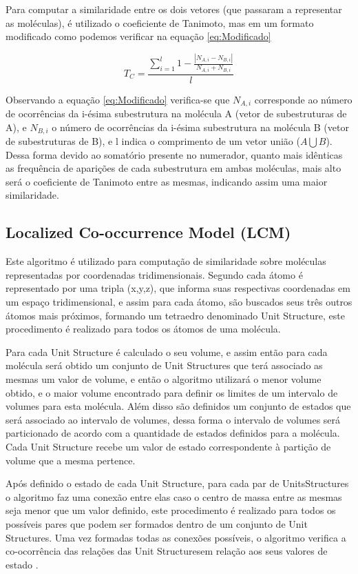 Para computar a similaridade entre os dois vetores (que passaram a representar as 
moléculas), é utilizado o coeficiente de Tanimoto, mas em um formato modificado como podemos verificar na equação \eqref{eq:Modificado}

\begin{equation}
T_{C} =\frac{\sum\limits_{i=1}^{l}1-\frac{|N_{A,i}-N_{B,i}|}{N_{A,i}+N_{B,i}}}{l}
\label{eq:Modificado}
\end{equation}

Observando a equação \eqref{eq:Modificado} verifica-se que $N_{A,i}$ corresponde ao número de ocorrências da i-ésima subestrutura na molécula A (vetor de subestruturas de A), e $N_{B,i}$ o número de 
ocorrências da i-ésima subestrutura na molécula B (vetor de subestruturas de B), e l indica o 
comprimento de um vetor união ($A\bigcup B$). Dessa forma devido ao somatório presente no 
numerador, quanto mais idênticas as frequência de aparições de cada subestrutura em ambas 
moléculas, mais alto será o coeficiente de Tanimoto entre as mesmas, indicando assim uma 
maior similaridade.

\subsection{Localized Co-occurrence Model (LCM)}
Este algoritmo é utilizado para computação de similaridade sobre moléculas
representadas por coordenadas tridimensionais. Segundo \cite{huang2008localized} cada átomo é representado por uma tripla (x,y,z), que informa suas respectivas coordenadas em um espaço tridimensional, e assim para cada átomo, são buscados seus três outros átomos mais próximos, formando um tetraedro denominado Unit Structure, este procedimento é realizado para todos os átomos de uma molécula.

Para cada Unit Structure é calculado o seu volume, e assim então para cada molécula 
será obtido um conjunto de Unit Structures que terá associado as mesmas um valor de 
volume, e então o algoritmo utilizará o menor volume obtido, e o maior volume encontrado 
para definir os limites de um intervalo de volumes para esta molécula. Além disso são 
definidos um conjunto de estados que será associado ao intervalo de volumes, dessa forma o 
intervalo de volumes será particionado de acordo com a quantidade de estados definidos para 
a molécula. Cada Unit Structure recebe um valor de estado correspondente à partição de 
volume que a mesma pertence.

Após definido o estado de cada Unit Structure, para cada par de UnitsStructures o
algoritmo faz uma conexão entre elas caso o centro de massa entre as mesmas seja menor que 
um valor definido, este procedimento é realizado para todos os possíveis pares que podem ser 
formados dentro de um conjunto de Unit Structures. Uma vez formadas todas as conexões 
possíveis, o algoritmo verifica a co-ocorrência das relações das Unit Structuresem relação aos seus valores de estado \cite{huang2008localized}.

